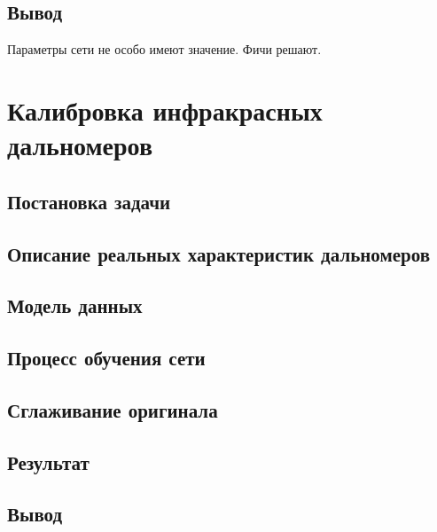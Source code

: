 \documentclass[14pt]{extreport}
\begin{document}
        \section{Вывод}
            Параметры сети не особо имеют значение. Фичи решают.
    \chapter{Калибровка инфракрасных дальномеров}
        \section{Постановка задачи}
        \section{Описание реальных характеристик дальномеров}
        \section{Модель данных}
        \section{Процесс обучения сети}
        \section{Сглаживание оригинала}
        \section{Результат}
        \section{Вывод}
\end{document}
